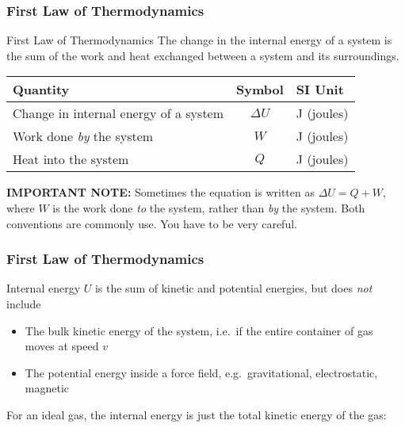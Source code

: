 \documentclass[12pt,aspectratio=169]{beamer}
\newcommand{\eq}[2]{\vspace{#1}{\Large\begin{displaymath}#2\end{displaymath}}}
\begin{document}
\begin{frame}
  \frametitle{First Law of Thermodynamics}
  \begin{block}{First Law of Thermodynamics}
    The change in the internal energy of a system is the sum of the work and
    heat exchanged between a system and its surroundings. 
  \end{block}
  
  \eq{-.2in}{
    \boxed{\Delta U=Q-W}
  }
  \begin{center}
    \begin{tabular}{l|c|l}
      \rowcolor{pink}
      \textbf{Quantity} & \textbf{Symbol} & \textbf{SI Unit} \\ \hline
      Change in internal energy of a system & $\Delta U$ & \si{J} (joules) \\
      Work done \emph{by} the system & $W$                 & \si{J} (joules) \\
      Heat into the system           & $Q$                 & \si{J} (joules)
    \end{tabular}
  \end{center}
  
  {\footnotesize
    \textbf{IMPORTANT NOTE:} Sometimes the equation is written as
    $\Delta U=Q+W$, where $W$ is the work done \emph{to} the system, rather
    than \emph{by} the system. Both conventions are commonly use. You have to
    be very careful.\par
  }
\end{frame}


\begin{frame}
  \frametitle{First Law of Thermodynamics}
  
  Internal energy $U$ is the sum of kinetic and potential energies, but does
  \emph{not} include
  \begin{itemize}
  \item The bulk kinetic energy of the system, i.e.\ if the entire container
    of gas moves at speed $v$
  \item The potential energy inside a force field, e.g.\ gravitational,
    electrostatic, magnetic
  \end{itemize}
  For an ideal gas, the internal energy is just the total kinetic energy of the
  gas:

  \eq{-.2in}{
    U=K=\frac{1}{2}NkT=\frac{1}{2}nRT
  }
\end{frame}
\end{document}
